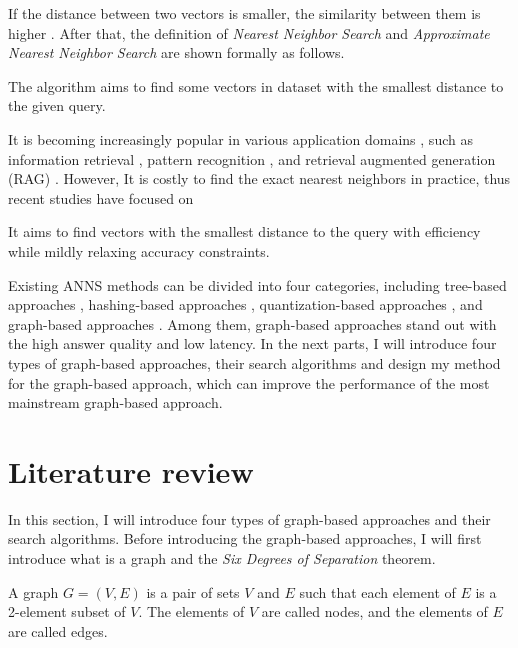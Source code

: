 \documentclass[UTF8]{article}
\begin{document}
If the distance between two vectors is smaller, the similarity between them is higher \cite{wang2024distance}.
After that, the definition of \textit{Nearest Neighbor Search} and \textit{Approximate Nearest Neighbor Search} are shown
formally as follows.

\begin{definition}
  The algorithm aims to find some vectors in dataset with the smallest distance to the given query.
\end{definition}

It is becoming increasingly popular in various application domains \cite{arora2018hd}, 
such as information retrieval \cite{zhu2019accelerating}, 
pattern recognition \cite{kosuge2019object}, and retrieval augmented generation (RAG) \cite{brown2020language}. 
However, It is costly to find the exact nearest neighbors in practice, thus recent studies have focused on 

\begin{definition}
  It aims to find vectors with the smallest distance to the query 
  with efficiency while mildly relaxing accuracy constraints.
\end{definition}

Existing ANNS methods can be divided into four categories, including tree-based approaches \cite{arora2018hd}, 
hashing-based approaches \cite{huang2015query}, quantization-based approaches \cite{dobson2023scaling}, and graph-based approaches \cite{fu2017fast}. 
Among them, graph-based approaches stand out with the high answer quality and low latency. 
In the next parts, I will introduce four types of graph-based approaches, their search algorithms and design my method 
for the graph-based approach, which can improve the performance of the most mainstream graph-based approach.

\section{Literature review}
In this section, I will introduce four types of graph-based approaches and their search algorithms.
Before introducing the graph-based approaches, I will first introduce what is a graph and 
the \textit{Six Degrees of Separation} theorem. 

\begin{definition}[Graph]
  A graph $G = (V, E)$ is a pair of sets $V$ and $E$ such that each element of $E$ is a 2-element subset of $V$.
  The elements of $V$ are called nodes, and the elements of $E$ are called edges.
\end{definition}
\end{document}
